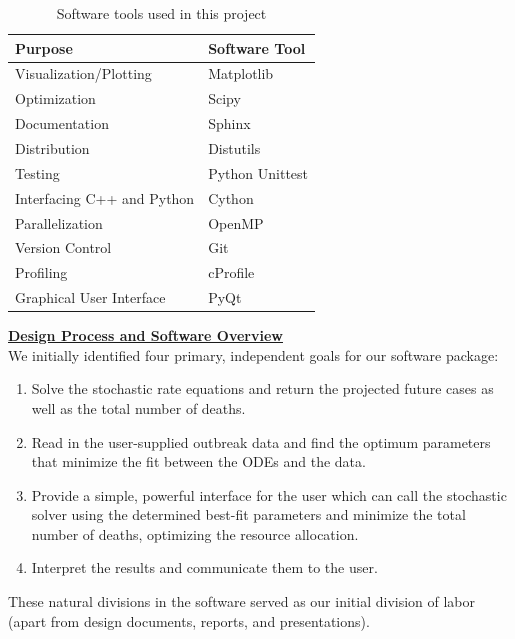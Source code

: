 \documentclass[11pt,letter]{article}
\begin{document}
\begin{table}
\caption{Software tools used in this project}
\begin{center}
	\begin{tabular}{ |l|l| }
	\hline
	\textbf{Purpose} & \textbf{Software Tool} \\ 
	\hline
	Visualization/Plotting & Matplotlib \\
	\hline
	Optimization & Scipy \\
	\hline
	Documentation  & Sphinx \\
	\hline
	Distribution & Distutils \\
        \hline
        Testing  & Python Unittest \\
        \hline
        Interfacing C++ and Python & Cython \\
        \hline
        Parallelization & OpenMP \\
        \hline
        Version Control & Git \\
        \hline
        Profiling & cProfile \\ 
        \hline
        Graphical User Interface & PyQt \\
        \hline
	\end{tabular}
\end{center}
\end{table}

\underline{\textbf{Design Process and Software Overview}}\vspace{0.5mm}\\
We initially identified four primary, independent goals for our software package:
\begin{enumerate}
	\item{Solve the stochastic rate equations and return the projected future cases as well as the total number of deaths.}
	\item{Read in the user-supplied outbreak data and find the optimum parameters that minimize the fit between the ODEs and the data.}
	\item{Provide a simple, powerful interface for the user which can call the stochastic solver using the determined best-fit parameters and minimize the total number of deaths, optimizing the resource allocation.}
	\item{Interpret the results and communicate them to the user.}
\end{enumerate}
These natural divisions in the software served as our initial division of labor (apart from design documents, reports, and presentations).\\
\end{document}
